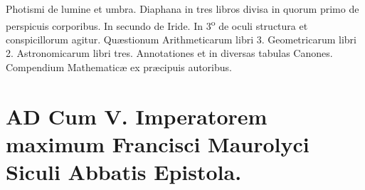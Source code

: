 \documentclass[11pt,a4paper]{article}
\begin{document}
Photismi de lumine et umbra. Diaphana in tres libros divisa in quorum primo de perspicuis corporibus. In secundo de Iride. In 3\textsuperscript{o} de oculi structura et conspicillorum agitur. Quæstionum Arithmeticarum libri 3. Geometricarum libri 2. Astronomicarum libri tres. Annotationes \ill{} et in diversas tabulas Canones. Compendium Mathematicæ ex præcipuis autoribus.


\section*{AD Cum V. Imperatorem maximum Francisci Maurolyci Siculi Abbatis Epistola.}
\end{document}
